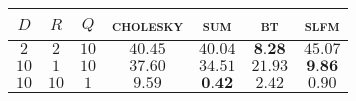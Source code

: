 
\begin{tabular}{ccccccc}
\toprule
  $D$ & $R$ & $Q$ & \textsc{cholesky} & \textsc{sum} & \textsc{bt} & \textsc{slfm}\\\midrule
 $ 2 $ & $ 2 $ & $ 10 $ & $ 40.45 $ & $ 40.04 $ & $ \textbf{8.28} $ & $ 45.07 $ \\ 
 $ 10 $ & $ 1 $ & $ 10 $ & $ 37.60 $ & $ 34.51 $ & $ 21.93 $ & $ \textbf{9.86} $ \\ 
 $ 10 $ & $ 10 $ & $ 1 $ & $ 9.59 $ & $ \textbf{0.42} $ & $ 2.42 $ & $ 0.90 $ \\
\bottomrule
\end{tabular}
